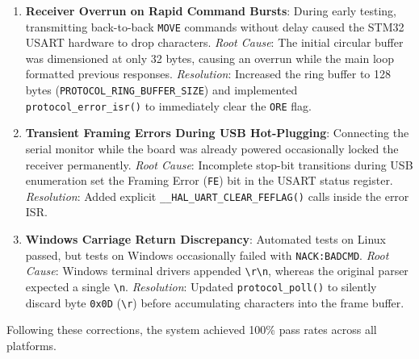 \begin{enumerate}
    \item \textbf{Receiver Overrun on Rapid Command Bursts}:
    During early testing, transmitting back-to-back \texttt{MOVE} commands without delay caused the STM32 USART hardware to drop characters.
    \emph{Root Cause}: The initial circular buffer was dimensioned at only 32 bytes, causing an overrun while the main loop formatted previous responses.
    \emph{Resolution}: Increased the ring buffer to 128 bytes (\texttt{PROTOCOL\_RING\_BUFFER\_SIZE}) and implemented \texttt{protocol\_error\_isr()} to immediately clear the \texttt{ORE} flag.
    \item \textbf{Transient Framing Errors During USB Hot-Plugging}:
    Connecting the serial monitor while the board was already powered occasionally locked the receiver permanently.
    \emph{Root Cause}: Incomplete stop-bit transitions during USB enumeration set the Framing Error (\texttt{FE}) bit in the USART status register.
    \emph{Resolution}: Added explicit \texttt{\_\_HAL\_UART\_CLEAR\_FEFLAG()} calls inside the error ISR.
    \item \textbf{Windows Carriage Return Discrepancy}:
    Automated tests on Linux passed, but tests on Windows occasionally failed with \texttt{NACK:BADCMD}.
    \emph{Root Cause}: Windows terminal drivers appended \texttt{\textbackslash r\textbackslash n}, whereas the original parser expected a single \texttt{\textbackslash n}.
    \emph{Resolution}: Updated \texttt{protocol\_poll()} to silently discard byte \texttt{0x0D} (\texttt{\textbackslash r}) before accumulating characters into the frame buffer.
\end{enumerate}
Following these corrections, the system achieved 100\% pass rates across all platforms.
